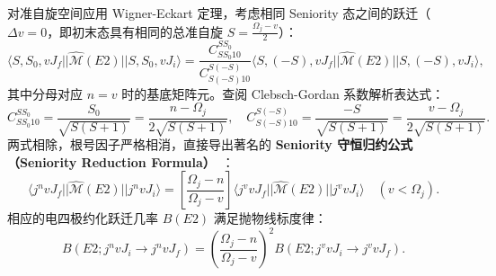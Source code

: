 对准自旋空间应用 Wigner-Eckart 定理，考虑相同 Seniority 态之间的跃迁（$\Delta v = 0$，即初末态具有相同的总准自旋 $S = \frac{\Omega_j - v}{2}$）：
\begin{equation}\label{eq:4-6-quasispin-wigner-eckart}
\langle S, S_0, v J_f || \hat{\mathcal{M}}(E2) || S, S_0, v J_i \rangle = \frac{C_{S S_0 1 0}^{S S_0}}{C_{S (-S) 1 0}^{S (-S)}} \langle S, (-S), v J_f || \hat{\mathcal{M}}(E2) || S, (-S), v J_i \rangle,
\end{equation}
其中分母对应 $n=v$ 时的基底矩阵元。查阅 Clebsch-Gordan 系数解析表达式：
\begin{equation}\label{eq:4-6-CG-eval}
C_{S S_0 1 0}^{S S_0} = \frac{S_0}{\sqrt{S(S+1)}} = \frac{n - \Omega_j}{2 \sqrt{S(S+1)}}, \quad C_{S (-S) 1 0}^{S (-S)} = \frac{-S}{\sqrt{S(S+1)}} = \frac{v - \Omega_j}{2 \sqrt{S(S+1)}}.
\end{equation}
两式相除，根号因子严格相消，直接导出著名的 \textbf{Seniority 守恒归约公式（Seniority Reduction Formula）}~\cite{book-jain-nuclear-isomers}：
\begin{equation}\label{eq:4-6-seniority-reduction}
\langle j^n v J_f || \hat{\mathcal{M}}(E2) || j^n v J_i \rangle = \left[ \frac{\Omega_j - n}{\Omega_j - v} \right] \langle j^v v J_f || \hat{\mathcal{M}}(E2) || j^v v J_i \rangle \quad (v < \Omega_j).
\end{equation}
相应的电四极约化跃迁几率 $B(E2)$ 满足抛物线标度律：
\begin{equation}\label{eq:4-6-BE2-seniority-parabola}
B(E2; j^n v J_i \to j^n v J_f) = \left( \frac{\Omega_j - n}{\Omega_j - v} \right)^2 B(E2; j^v v J_i \to j^v v J_f).
\end{equation}

